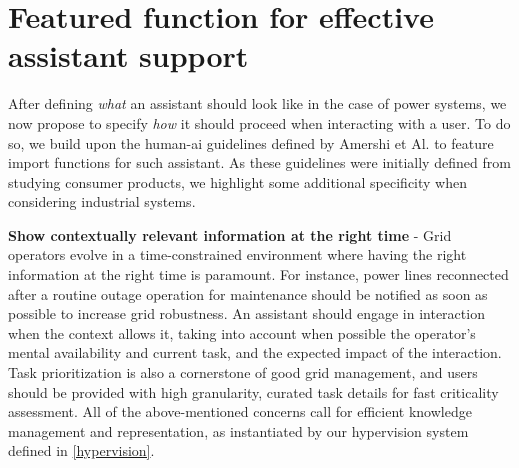 \documentclass{IOS-Book-Article}
\begin{document}
\vspace{-0.5cm}
\section{Featured function for effective assistant support}
\label{sec:expected_functions}
After defining \emph{what} an assistant should look like in the case of power systems,  we now propose to specify \emph{how} it should proceed when interacting with a user. To do so, we build upon the human-ai guidelines defined by Amershi et Al. \cite{human-ai-interactions} to feature import functions for such assistant. As these guidelines were initially defined from studying consumer products, we highlight some additional specificity when considering industrial systems. 

\textbf{Show contextually relevant information at the right time} - Grid operators evolve in a time-constrained environment where having the right information at the right time is paramount. For instance, power lines reconnected after a routine outage operation for maintenance should be notified as soon as possible to increase grid robustness. An assistant should engage in interaction when the context allows it, taking into account when possible the operator's mental availability and current task, and the expected impact of the interaction. Task prioritization is also a cornerstone of good grid management, and users should be provided with high granularity, curated task details for fast criticality assessment. All of the above-mentioned concerns call for efficient knowledge management and representation, as instantiated by our hypervision system defined in \ref{hypervision}.

\end{document}
